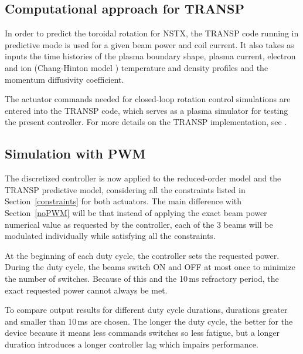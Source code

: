 \documentclass[12pt]{iopart}
\begin{document}
\subsection{Computational approach for TRANSP}
In order to predict the toroidal rotation for NSTX, the TRANSP code running in predictive mode is used for a given beam power and coil current. It also takes as inputs the time histories of the plasma boundary shape, plasma current, electron and ion (Chang-Hinton model \cite{Changhinton}) temperature and density profiles and the momentum diffusivity coefficient.

The actuator commands needed for closed-loop rotation control simulations are entered into the TRANSP code, which serves as a plasma simulator for testing the present controller. For more details on the TRANSP implementation, see \cite{Boyer15}.

\subsection{Simulation with PWM}
The discretized controller is now applied to the reduced-order model and the TRANSP predictive model, considering all the constraints listed in Section~\ref{constraints} for both actuators. The main difference with Section~\ref{noPWM} will be that instead of applying the exact beam power numerical value as requested by the controller, each of the 3 beams will be modulated individually while satisfying all the constraints.

At the beginning of each duty cycle, the controller sets the requested power. During the duty cycle, the beams switch ON and OFF at most once to minimize the number of switches. Because of this and the 10\,ms refractory period, the exact requested power cannot always be met.

To compare output results for different duty cycle durations, durations greater and smaller than 10\,ms are chosen. The longer the duty cycle, the better for the device because it means less commands switches so less fatigue, but a longer duration introduces a longer controller lag which impairs performance.
  
\end{document}
